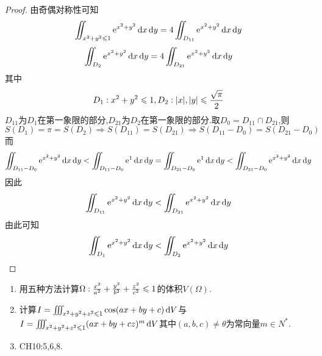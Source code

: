 \begin{proof}
    由奇偶对称性可知
    $$\iint_{x^2 + y^2 \leqslant 1} \mathrm{e}^{x^2 + y^2} \operatorname{d\!} x \operatorname{d\!} y = 4 \iint_{D_{11}} \mathrm{e}^{x^2 + y^2} \operatorname{d\!} x \operatorname{d\!} y$$
    $$\iint_{D_2} \mathrm{e}^{x^2 + y^2} \operatorname{d\!} x \operatorname{d\!} y = 4 \iint_{D_{21}} \mathrm{e}^{x^2 + y^2} \operatorname{d\!} x \operatorname{d\!} y$$
    其中$$D_1 : x^2 + y^2 \leqslant 1, D_2 : |x|,|y| \leqslant \frac{\sqrt \pi}{2}$$
    $D_{11}$为$D_1$在第一象限的部分,$D_{21}$为$D_2$在第一象限的部分.取$D_0 = D_{11} \cap D_{21}$,则$$S(D_1) = \pi = S(D_2) \Rightarrow S(D_{11}) = S(D_{21}) \Rightarrow S(D_{11} - D_0) = S(D_{21} - D_0)$$
    而\begin{align*}
        \iint_{D_{11} - D_0} \e^{x^2 + y^2} \dif x \dif y < \iint_{D_{11} - D_0} \e^1 \dif x \dif y  = \iint_{D_{21} - D_0} \e^1 \dif x \dif y < \iint_{D_{21}- D_0} \e^{x^2 + y^2} \dif x \dif y
    \end{align*}
    因此
    $$\iint_{D_{11}} \mathrm{e}^{x^2 + y^2} \operatorname{d\!} x \operatorname{d\!} y < \iint_{D_{21}} \mathrm{e}^{x^2 + y^2} \operatorname{d\!} x \operatorname{d\!} y$$
    由此可知$$\iint_{D_1} \mathrm{e}^{x^2 + y^2} \operatorname{d\!} x \operatorname{d\!} y < \iint_{D_2} \mathrm{e}^{x^2 + y^2} \operatorname{d\!} x \operatorname{d\!} y$$
\end{proof}



\begin{homework}
    \begin{enumerate}
        \item 用五种方法计算$\Omega: \frac{x^2}{a^2} + \frac{y^2}{b^2} + \frac{z^2}{c^2} \leqslant 1$的体积$V(\Omega)$.
        \item 计算$I = \iiint_{x^2 + y^2 + z^2 \leqslant 1} \cos(ax + by + c) \operatorname{d\!} V$与$I = \iiint_{x^2 + y^2 + z^2 \leqslant 1} (ax+by+cz)^m \operatorname{d\!} V$其中$(a,b,c) \neq \theta$为常向量$m \in N^*.$
        \item CH10:5,6,8.
    \end{enumerate}
\end{homework}































